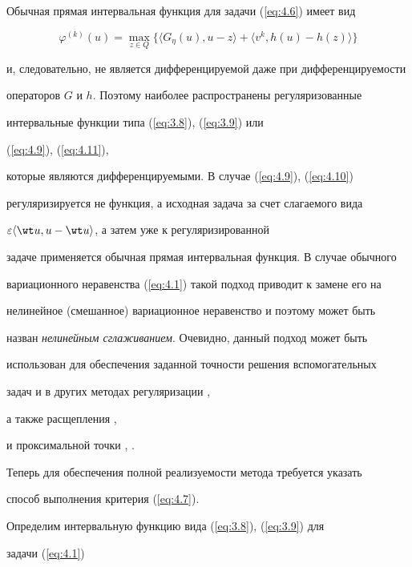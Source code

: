 \begin{note}


Обычная прямая интервальная функция для задачи (\ref{eq:4.6}) имеет вид 


$$


\varphi^{(k)} (u)=\max_{z \in Q} \{\langle G_{\eta} (u), u-z \rangle+


\langle v^{k}, h(u) - h(z) \rangle \}


$$


и, следовательно, не является дифференцируемой даже при дифференцируемости 


операторов $G$ и $h$. Поэтому наиболее распространены регуляризованные 


интервальные функции типа (\ref{eq:3.8}), (\ref{eq:3.9}) или


(\ref{eq:4.9}), (\ref{eq:4.11}), 


которые являются дифференцируемыми. В случае (\ref{eq:4.9}), (\ref{eq:4.10}) 


регуляризируется не функция, а исходная задача за счет слагаемого вида 


$\varepsilon\langle\wt u, u-\wt u\rangle$, а затем уже к регуляризированной 


задаче применяется обычная прямая интервальная функция. В случае обычного 


вариационного неравенства (\ref{eq:4.1}) такой подход приводит к замене его на 


нелинейное (смешанное) вариационное неравенство и поэтому может быть 


назван {\it нелинейным сглаживанием}. Очевидно, данный подход может быть 


использован для обеспечения заданной точности решения вспомогательных 


задач и в других методах регуляризации \cite{BG89},


а также расщепления \cite{LM79}, \cite{Gab83} 


и проксимальной точки \cite{Roc76}, \cite{GT89}.


\end{note}





Теперь для обеспечения полной реализуемости метода требуется указать 


способ выполнения критерия (\ref{eq:4.7}).


Определим интервальную функцию вида (\ref{eq:3.8}), (\ref{eq:3.9}) для 


задачи (\ref{eq:4.1})


